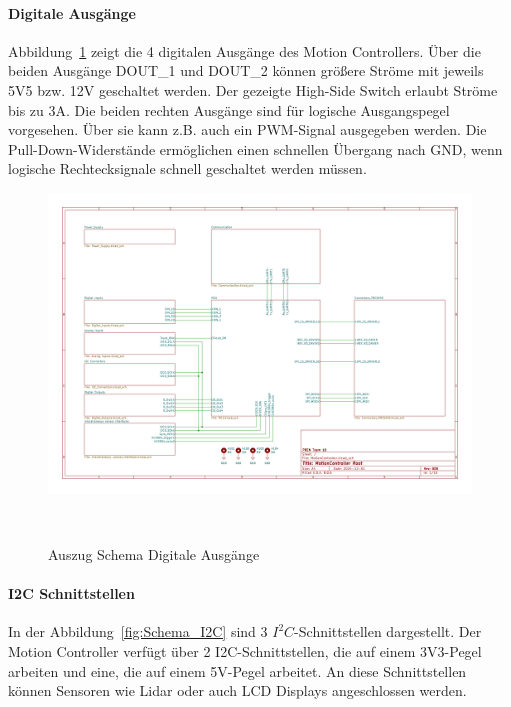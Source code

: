 \documentclass[main.  tex]{subfiles} %
\begin{document}
\paragraph{Digitale Ausgänge}
Abbildung~\ref{fig:Schema_DOut} zeigt die 4 digitalen Ausgänge des Motion
Controllers. Über die beiden Ausgänge DOUT_1 und DOUT_2 können größere Ströme
mit jeweils 5V5 bzw. 12V geschaltet werden. Der gezeigte High-Side Switch
erlaubt Ströme bis zu 3A. Die beiden rechten Ausgänge sind für logische
Ausgangspegel vorgesehen. Über sie kann z.B. auch ein PWM-Signal ausgegeben
werden. Die Pull-Down-Widerstände ermöglichen einen schnellen Übergang nach
GND, wenn logische Rechtecksignale schnell geschaltet werden müssen.

\begin{figure}[h!]
    \centering
    \includegraphics[page=8,width=\textwidth]{../Anhang_pdfs/MotionController.pdf}
    \caption{Auszug Schema Digitale Ausgänge}~\label{fig:Schema_DOut}
\end{figure}

\paragraph{I2C Schnittstellen}
In der Abbildung~\ref{fig:Schema_I2C} sind 3 $I^2C$-Schnittstellen dargestellt.
Der Motion Controller verfügt über 2 I2C-Schnittstellen, die auf einem
3V3-Pegel arbeiten und eine, die auf einem 5V-Pegel arbeitet. An diese
Schnittstellen können Sensoren wie Lidar oder auch LCD Displays angeschlossen
werden.
\end{document}
